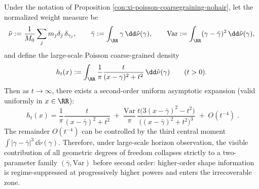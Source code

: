 \begin{proposition}\label{con:xi-poisson-coarsegraining-second-order-normal-form}
Under the notation of Proposition \ref{con:xi-poisson-coarsegraining-nohair}, let the normalized weight measure be
\[
\tilde\nu:=\frac{1}{M_0}\sum_{j}m_j\delta_j\,\delta_{\gamma_j},
\qquad
\bar\gamma:=\int_{\RR}\gamma\,\dd\tilde\nu(\gamma),
\qquad
\mathrm{Var}:=\int_{\RR}(\gamma-\bar\gamma)^2\,\dd\tilde\nu(\gamma),
\]
and define the large-scale Poisson coarse-grained density
\[
h_t(x):=\int_{\RR}\frac{1}{\pi}\frac{t}{(x-\gamma)^2+t^2}\,\dd\tilde\nu(\gamma)
\qquad (t>0).
\]
Then as \(t\to\infty\), there exists a second-order uniform asymptotic expansion (valid uniformly in \(x\in\RR\)):
\[
\boxed{\;
h_t(x)
=
\frac{1}{\pi}\frac{t}{(x-\bar\gamma)^2+t^2}
\;+\;
\frac{\mathrm{Var}}{\pi}\,
\frac{t\bigl(3(x-\bar\gamma)^2-t^2\bigr)}{\bigl((x-\bar\gamma)^2+t^2\bigr)^3}
\;+\;O(t^{-4})\; }.
\]
The remainder \(O(t^{-4})\) can be controlled by the third central moment \(\int|\gamma-\bar\gamma|^3\,\dd\tilde\nu(\gamma)\).
Therefore, under large-scale horizon observation, the visible contribution of all geometric degrees of freedom collapses strictly to a two-parameter family \((\bar\gamma,\mathrm{Var})\) before second order: higher-order shape information is regime-suppressed at progressively higher powers and enters the irrecoverable zone.
\end{proposition}


\endinput
